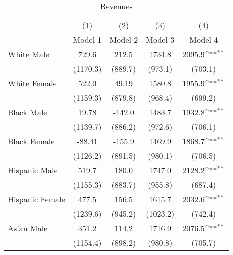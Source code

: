 \begin{table}[htbp]\centering
\def\sym#1{\ifmmode^{#1}\else\(^{#1}\)\fi}
\caption{Revenues}
\begin{tabular}{l*{4}{c}}
\hline\hline
                    &\multicolumn{1}{c}{(1)}&\multicolumn{1}{c}{(2)}&\multicolumn{1}{c}{(3)}&\multicolumn{1}{c}{(4)}\\
                    &\multicolumn{1}{c}{Model 1}&\multicolumn{1}{c}{Model 2}&\multicolumn{1}{c}{Model 3}&\multicolumn{1}{c}{Model 4}\\
\hline
White Male          &       729.6         &       212.5         &      1734.8         &      2095.9\sym{**} \\
                    &    (1170.3)         &     (889.7)         &     (973.1)         &     (703.1)         \\
[1em]
White Female        &       522.0         &       49.19         &      1580.8         &      1955.9\sym{**} \\
                    &    (1159.3)         &     (879.8)         &     (968.4)         &     (699.2)         \\
[1em]
Black Male          &       19.78         &      -142.0         &      1483.7         &      1932.8\sym{**} \\
                    &    (1139.7)         &     (886.2)         &     (972.6)         &     (706.1)         \\
[1em]
Black Female        &      -88.41         &      -155.9         &      1469.9         &      1868.7\sym{**} \\
                    &    (1126.2)         &     (891.5)         &     (980.1)         &     (706.5)         \\
[1em]
Hispanic Male       &       519.7         &       180.0         &      1747.0         &      2128.2\sym{**} \\
                    &    (1155.3)         &     (883.7)         &     (955.8)         &     (687.4)         \\
[1em]
Hispanic Female     &       477.5         &       156.5         &      1615.7         &      2032.6\sym{**} \\
                    &    (1239.6)         &     (945.2)         &    (1023.2)         &     (742.4)         \\
[1em]
Asian Male          &       351.2         &       114.2         &      1716.9         &      2076.5\sym{**} \\
                    &    (1154.4)         &     (898.2)         &     (980.8)         &     (705.7)         \\

\end{tabular}
\end{table}
